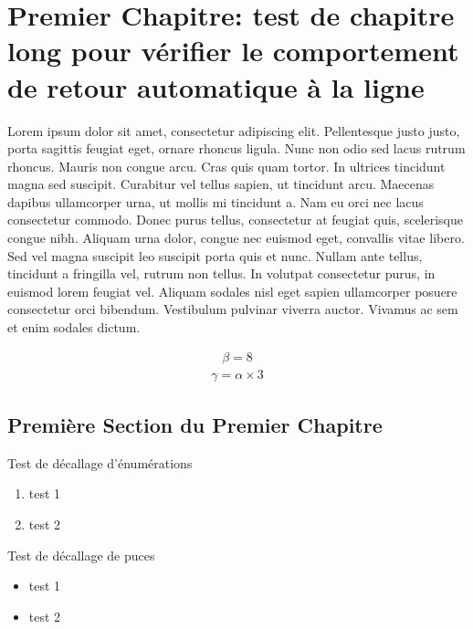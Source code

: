 \documentclass[letterpaper, twoside, 12pt,these,creativecommons,hyperref]{thETS}
\begin{document}
%
%

\chapter{Premier Chapitre: test de chapitre long pour vérifier le comportement de retour automatique à la ligne}

Lorem ipsum dolor sit amet, consectetur adipiscing elit. Pellentesque justo justo, porta sagittis feugiat eget, ornare rhoncus ligula. Nunc non odio sed lacus rutrum rhoncus. Mauris non congue arcu. Cras quis quam tortor. In ultrices tincidunt magna sed suscipit. Curabitur vel tellus sapien, ut tincidunt arcu. Maecenas dapibus ullamcorper urna, ut mollis mi tincidunt a. Nam eu orci nec lacus consectetur commodo. Donec purus tellus, consectetur at feugiat quis, scelerisque congue nibh. Aliquam urna dolor, congue nec euismod eget, convallis vitae libero. Sed vel magna suscipit leo suscipit porta quis et nunc. Nullam ante tellus, tincidunt a fringilla vel, rutrum non tellus. In volutpat consectetur purus, in euismod lorem feugiat vel. Aliquam sodales nisl eget sapien ullamcorper posuere consectetur orci bibendum. Vestibulum pulvinar viverra auctor. Vivamus ac sem et enim sodales dictum.

\begin{align}
   \beta = 8
\end{align}
\begin{align}
   \gamma = \alpha \times 3
\end{align}


\section{Première Section du Premier Chapitre}

Test de décallage d'énumérations
\begin{enumerate}
 \item test 1
 \item test 2
\end{enumerate}

Test de décallage de puces

\begin{itemize}
 \item test 1
 \item test 2
\end{itemize}
\end{document}
